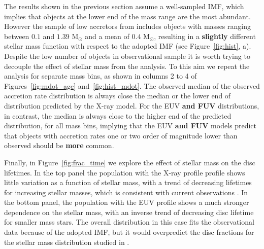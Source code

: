 \documentclass[fleqn,usenatbib]{mnras}
\newcommand\km{\textcolor{magenta}}
\begin{document}
The results shown in the previous section assume a well-sampled IMF, which implies that objects at the lower end of the mass range are the most abundant. However the sample of low accretors from  includes objects with masses ranging between $0.1$ and $1.39$ M$_\odot$ and a mean of $0.4$ M$_\odot$, resulting in a \textbf{slightly} different stellar mass function with respect to the adopted IMF (see Figure~\ref{fig:hist}, a). Despite the low number of objects in observational sample it is worth trying to decouple the effect of stellar mass from the analysis. To this aim we repeat the analysis for separate mass bins, as shown in columns 2 to 4 of Figures~\ref{fig:mdot_age} and~\ref{fig:hist_mdot}. The observed median of the observed accretion rate distribution is always close the median or the lower end of distribution predicted by the X-ray model. For the EUV \textbf{and FUV} distributions, in contrast, the median is always close to the higher end of the predicted distribution, for all mass bins, implying that the EUV \textbf{and FUV} models predict that objects with accretion rates one or two order of magnitude lower than observed should be \textbf{more} common.


Finally, in Figure~\ref{fig:frac_time} we explore the effect of stellar mass on the disc lifetimes. In the top panel the population with the X-ray profile profile shows little variation as a function of stellar mass, with a trend of decreasing lifetimes for increasing stellar masses, which is consistent with current observations \citep{Ribas2015}. In the bottom panel, the population with the EUV profile shows a much stronger dependence on the stellar mass, with an inverse trend of decreasing disc lifetime for smaller mass stars. The overall distribution in this case fits the observational data because of the adopted IMF, but it would overpredict the disc fractions for the stellar mass distribution studied in .
\end{document}
